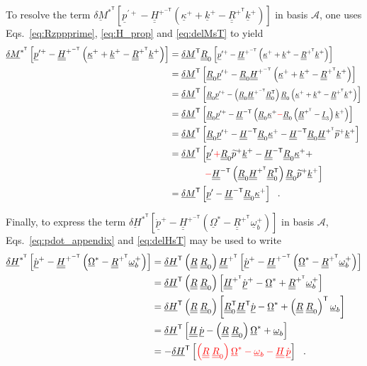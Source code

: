 \documentclass[12pt,a4paper,oneside,english]{abntex2} %
\newcommand{\fix}[1]{{\color{red}#1}}
\newcommand{\vect}[1]{\underline{#1}}
\def\tens#1{\underline{\underline{#1}}}
\def\til#1{\widetilde{#1}}
\def\lb{\left[}
\def\rb{\right]}
\def\lp{\left(}
\def\rp{\right)}
\def\T{\mathsf{T}}
\def\A{\mathcal{A}}
\def\Ithree{\tens{I}_3}
\def\R{\tens{R}}
\def\RpT{\R^{+^\T}}
\def\Rz{\R_0}
\def\RzT{\R^\T_0}
\def\om{\vect{\omega}_b}
\def\omp{\om^{+}}
\def\kap{\vect{\kappa}}
\def\kapp{\kap^{+}}
\def\k{\vect{k}}
\def\kp{\k^{+}}
\def\Om{\vect{\Omega}}
\def\Oms{\Om^{*}}
\def\H{\tens{H}}
\def\HT{\H^\T}
\def\HinvT{\H^{-\T}}
\def\HpT{\H^{+^\T}}
\def\HpmT{\H^{+^{-\T}}}
\def\p{\vect{p}}
\def\pprime{\p^{\prime}}
\def\pdot{\dot{\p}}
\def\ppdot{\pdot^{+}}
\def\ppprime{\p^{\prime{+}}}
\def\pptil{\til{p}^+}
\def\delM{\vect{\delta M}}
\def\delMT{\delM^\T}
\def\delH{\vect{\delta H}}
\def\delHT{\delH^\T}
\def\delMsT{\delM^{*^\T}}
\def\delHsT{\delH^{*^\T}}
\def\RRz{\lp\R\;\Rz\rp}
\def\RRzT{\RRz^\T}
\begin{document}
\begin{apendicesenv}
To resolve the term $\delMsT \lb\ppprime-\HpmT\lp\kapp+\kp-\RpT\kp\rp\rb$ in basis $\A$, one uses Eqs.~\eqref{eq:Rzppprime}, \eqref{eq:H_prop} and \eqref{eq:delMsT} to yield
\begin{align}
    \delMsT\lb\ppprime-\HpmT\lp\kapp+\kp-\RpT\kp\rp\rb &= 
    \delMT\Rz \lb \scalebox{0.85}{$\displaystyle \ppprime -\HpmT\lp\kapp+\kp-\RpT\kp\rp$} \rb
    \nonumber
    \\
    &= \delMT\lb \scalebox{0.95}{$\displaystyle \Rz\ppprime-\Rz\HpmT\lp\kapp+\kp-\RpT\kp\rp$} \rb
    \nonumber 
    \\
    &= \delMT\lb \scalebox{0.80}{$\displaystyle \Rz\ppprime -\lp\Rz\HpmT\RzT\rp\Rz\lp\kapp+\kp-\RpT\kp\rp$} \rb
    \nonumber 
    \\
    &= \delMT\lb \scalebox{0.85}{$\displaystyle \Rz\ppprime -\HinvT\lp\Rz\kapp\fix{-}\Rz\lp\RpT-\Ithree\rp\kp\rp$} \rb
    \nonumber 
    \\
    &= \delMT\lb \scalebox{0.95}{$\displaystyle \Rz\ppprime-\HinvT\Rz\kapp-\HinvT\Rz\HpT\pptil\kp$} \rb
    \nonumber 
    \\
    &= \delMT\left[ \pprime \fix{+} \Rz\pptil\kp - \HinvT\Rz\kapp + \right.
    \nonumber 
    \\
    &\hphantom{\delMT\left[\right.+}\left. \fix{-}\HinvT\lp\Rz\HpT\RzT\rp\Rz\pptil\kp \right]
    \nonumber 
    \\
    &= \delMT\lb\pprime-\HinvT\Rz\kapp\rb \ \ .
    \label{eq:delM_transform}
\end{align}

Finally, to express the term $\delHsT\lb\ppdot-\HpmT\lp\Oms-\RpT\omp\rp\rb$ in \fix{basis $\A$}, Eqs.~\eqref{eq:pdot_appendix} and \eqref{eq:delHsT} may be used to write
\begin{align}
    \delHsT\lb\ppdot-\HpmT\lp\Oms-\RpT\omp\rp\rb &= 
    \delHT\RRz\HpT \lb\ppdot-\HpmT\lp\Oms-\RpT\omp\rp\rb
    \nonumber \\
    &= \delHT\RRz\lb \HpT\ppdot - \Oms + \RpT\omp \rb
    \nonumber \\
    &= \delHT\RRz\lb \RzT\HT\pdot - \Oms + \RRzT\om \rb
    \nonumber \\
    &= \delHT\lb \H\,\pdot - \RRz\Oms + \om \rb
    \nonumber \\
    &= -\delHT\lb\fix{\RRz\Oms-\om-\H\,\pdot}\rb \ \ .
    \label{eq:delH_transform}
\end{align}


\end{apendicesenv}
\end{document}
